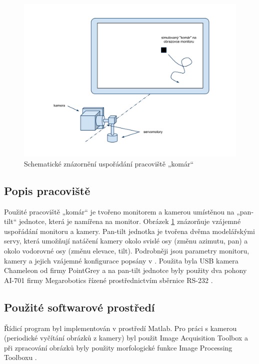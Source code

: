 \documentclass[a4paper,10pt]{article}
\begin{document}
		\begin{figure}[!h]
			\centering
			 \includegraphics[width=1\columnwidth]{pics/usporadani_pracoviste}
			 \caption{Schematické znázornění uspořádání pracoviště „komár“}\label{fig:usporadaniPracoviste}
		\end{figure}

	\subsection{Popis pracoviště}

		Použité pracoviště „komár“ je tvořeno monitorem a kamerou umístěnou na „pan-tilt“ jednotce, která je namířena
		na monitor. Obrázek \ref{fig:usporadaniPracoviste} znázorňuje vzájemné uspořádání monitoru a kamery.
		Pan-tilt jednotka je tvořena dvěma mo\-de\-lář\-ský\-mi servy, která umožňují natáčení kamery okolo svislé osy
		(změnu azimutu, pan) a okolo vodorovné osy (změnu elevace, tilt).
		Podrobněji jsou parametry monitoru, kamery a jejich vzájemné konfigurace popsány v \cite{kamera}.
		Použita byla USB kamera Chameleon od firmy PointGrey \cite{kameraDatasheet} a na pan-tilt jednotce byly
		použity dva pohony AI-701 firmy Megarobotics řízené prostřednictvím sběrnice RS-232 \cite{servaManual}.

	\subsection{Použité softwarové prostředí}

		Řídicí program byl implementován v prostředí Matlab. Pro práci s kamerou (periodické vyčítání
		obrázků z kamery) byl použit Image Acquisition Toolbox \cite{imaq} a při zpracování obrázků
		byly použity morfologické funkce Image Processing Toolboxu \cite{imageProcessingToolbox}.
\end{document}
